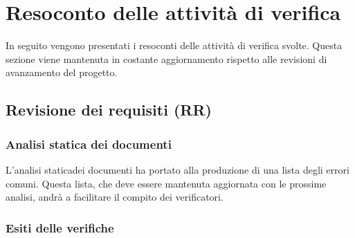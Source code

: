 \section{Resoconto delle attività di verifica}
In seguito vengono presentati i resoconti delle attività di verifica svolte.
Questa sezione viene mantenuta in costante aggiornamento rispetto alle revisioni di avanzamento del progetto\glo.
\subsection{Revisione dei requisiti (RR)}
\subsubsection{Analisi statica dei documenti}
L'analisi statica\glosp dei documenti ha portato alla produzione di una lista degli errori comuni. Questa lista, che deve essere mantenuta aggiornata con le prossime analisi, andrà a facilitare il compito dei verificatori.
\subsubsection{Esiti delle verifiche} 
